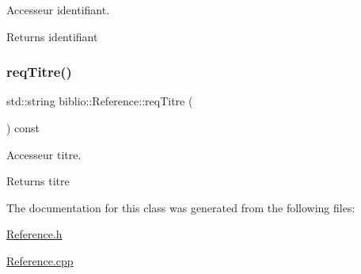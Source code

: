 Accesseur identifiant. 

\begin{DoxyReturn}{Returns}
identifiant 
\end{DoxyReturn}
\mbox{\label{classbiblio_1_1Reference_af8ad0d5a379d11a0ea8eccacf6898f93}} 
\subsubsection{\texorpdfstring{req\+Titre()}{reqTitre()}}
{\footnotesize\ttfamily std\+::string biblio\+::\+Reference\+::req\+Titre (\begin{DoxyParamCaption}{ }\end{DoxyParamCaption}) const\hspace{0.3cm}{\ttfamily [inline]}}



Accesseur titre. 

\begin{DoxyReturn}{Returns}
titre 
\end{DoxyReturn}


The documentation for this class was generated from the following files\+:\begin{DoxyCompactItemize}
\item 
\hyperlink{Reference_8h}{Reference.\+h}\item 
\hyperlink{Reference_8cpp}{Reference.\+cpp}\end{DoxyCompactItemize}
